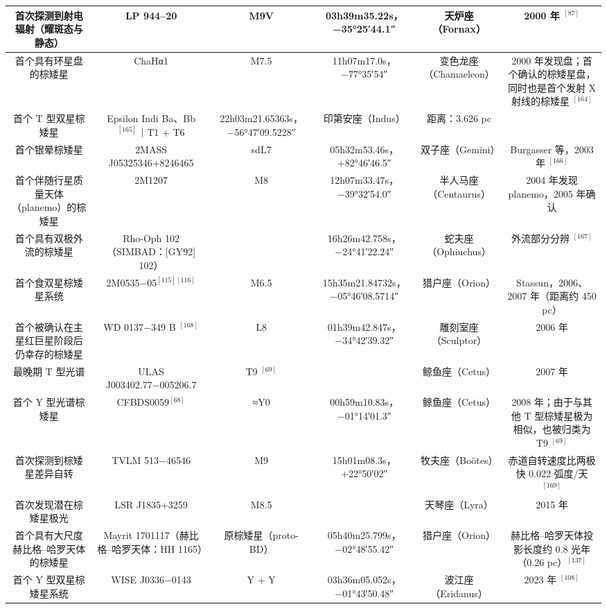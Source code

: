 \begin{table}[ht]
\begin{tabular}{|c|c|c|c|c|c|}
首次探测到射电辐射（耀斑态与静态）& LP 944–20 & M9V & 03h39m35.22s，−35°25′44.1″ & 天炉座（Fornax）& 2000 年 $^{[87]}$\\
\hline
首个具有环星盘的棕矮星 & ChaHα1 & M7.5 & 11h07m17.0s，−77°35′54″ & 变色龙座（Chamaeleon） & 2000 年发现盘；首个确认的棕矮星盘，同时也是首个发射 X 射线的棕矮星 $^{[164]}$\\
\hline
首个 T 型双星棕矮星 & Epsilon Indi Ba、Bb$^{[165]}$｜T1 + T6 & 22h03m21.65363s，−56°47′09.5228″ & 印第安座（Indus） & 距离：3.626 pc\\
\hline
首个银晕棕矮星 & 2MASS J05325346+8246465 & sdL7 & 05h32m53.46s，+82°46′46.5″ & 双子座（Gemini） & Burgasser 等，2003 年 $^{[166]}$\\
\hline
首个伴随行星质量天体（planemo）的棕矮星 & 2M1207 & M8 & 12h07m33.47s，−39°32′54.0″ & 半人马座（Centaurus）& 2004 年发现 planemo，2005 年确认\\
\hline
首个具有双极外流的棕矮星 & Rho-Oph 102（SIMBAD：[GY92] 102） &  & 16h26m42.758s，−24°41′22.24″ & 蛇夫座（Ophiuchus）& 外流部分分辨 $^{[167]}$\\
\hline
首个食双星棕矮星系统 & 2M0535−05$^{[115][116]}$ & M6.5 & 15h35m21.84732s，−05°46′08.5714″ & 猎户座（Orion）& Stassun，2006、2007 年（距离约 450 pc）\\
\hline
首个被确认在主星红巨星阶段后仍幸存的棕矮星 & WD 0137−349 B $^{[168]}$ & L8 & 01h39m42.847s，−34°42′39.32″ & 雕刻室座（Sculptor） & 2006 年\\
\hline
最晚期 T 型光谱 & ULAS J003402.77−005206.7 & T9 $^{[69]}$ &  & 鲸鱼座（Cetus） & 2007 年\\
\hline
首个 Y 型光谱棕矮星 & CFBDS0059$^{[68]}$ & ≈Y0 & 00h59m10.83s，−01°14′01.3″ & 鲸鱼座（Cetus） & 2008 年；由于与其他 T 型棕矮星极为相似，也被归类为 T9 $^{[69]}$\\
\hline
首次探测到棕矮星差异自转 & TVLM 513−46546 & M9 & 15h01m08.3s，+22°50′02″ & 牧夫座（Boötes）& 赤道自转速度比两极快 0.022 弧度/天 $^{[169]}$\\
\hline
首次发现潜在棕矮星极光 & LSR J1835+3259 & M8.5 &  & 天琴座（Lyra） & 2015 年\\
\hline
首个具有大尺度赫比格–哈罗天体的棕矮星 & Mayrit 1701117（赫比格–哈罗天体：HH 1165）& 原棕矮星（proto-BD） & 05h40m25.799s，−02°48′55.42″ & 猎户座（Orion） & 赫比格–哈罗天体投影长度约 0.8 光年（0.26 pc）$^{[137]}$\\
\hline
首个 Y 型双星棕矮星系统 & WISE J0336−0143 & Y + Y & 03h36m05.052s，−01°43′50.48″ & 波江座（Eridanus）& 2023 年 $^{[108]}$\\
\hline
\end{tabular}
\end{table}
